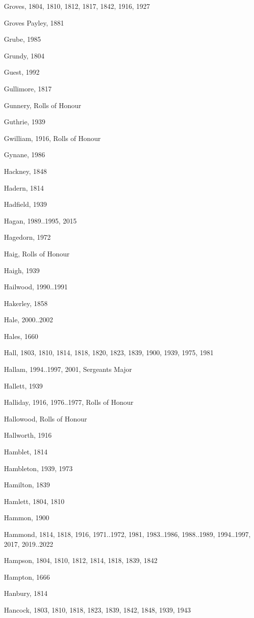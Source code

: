 {\begin{theindex}
\item Groves, 1804, 1810, 1812, 1817, 1842, 1916, 1927
\item Groves Payley, 1881
\item Grube, 1985
\item Grundy, 1804
\item Guest, 1992
\item Gullimore, 1817
\item Gunnery, Rolls of Honour
\item Guthrie, 1939
\item Gwilliam, 1916, Rolls of Honour
\item Gynane, 1986
\item Hackney, 1848
\item Hadern, 1814
\item Hadfield, 1939
\item Hagan, 1989..1995, 2015
\item Hagedorn, 1972
\item Haig, Rolls of Honour
\item Haigh, 1939
\item Hailwood, 1990..1991
\item Hakerley, 1858
\item Hale, 2000..2002
\item Hales, 1660
\item Hall, 1803, 1810, 1814, 1818, 1820, 1823, 1839, 1900, 1939, 1975, 1981
\item Hallam, 1994..1997, 2001, Sergeants Major
\item Hallett, 1939
\item Halliday, 1916, 1976..1977, Rolls of Honour
\item Hallowood, Rolls of Honour
\item Hallworth, 1916
\item Hamblet, 1814
\item Hambleton, 1939, 1973
\item Hamilton, 1839
\item Hamlett, 1804, 1810
\item Hammon, 1900
\item Hammond, 1814, 1818, 1916, 1971..1972, 1981, 1983..1986, 1988..1989, 1994..1997, 2017, 2019..2022
\item Hampson, 1804, 1810, 1812, 1814, 1818, 1839, 1842
\item Hampton, 1666
\item Hanbury, 1814
\item Hancock, 1803, 1810, 1818, 1823, 1839, 1842, 1848, 1939, 1943

\end{theindex}}
